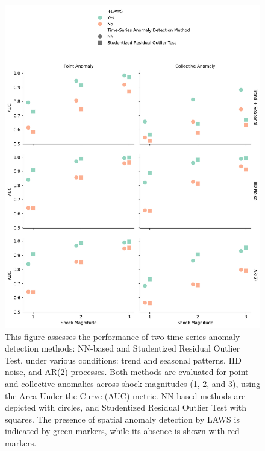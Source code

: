 \documentclass[11pt]{article}
\begin{document}
\begin{figure}[h]
    \centering
    \includegraphics[width=\textwidth]{../figure/simulation_result.png}
    \caption{This figure assesses the performance of two time series anomaly detection methods: NN-based and Studentized Residual Outlier Test, under various conditions: trend and seasonal patterns, IID noise, and AR(2) processes. Both methods are evaluated for point and collective anomalies across shock magnitudes (1, 2, and 3), using the Area Under the Curve (AUC) metric. NN-based methods are depicted with circles, and Studentized Residual Outlier Test with squares. The presence of spatial anomaly detection by LAWS is indicated by green markers, while its absence is shown with red markers.}
    \label{fig: simulation result}
\end{figure}
\end{document}
